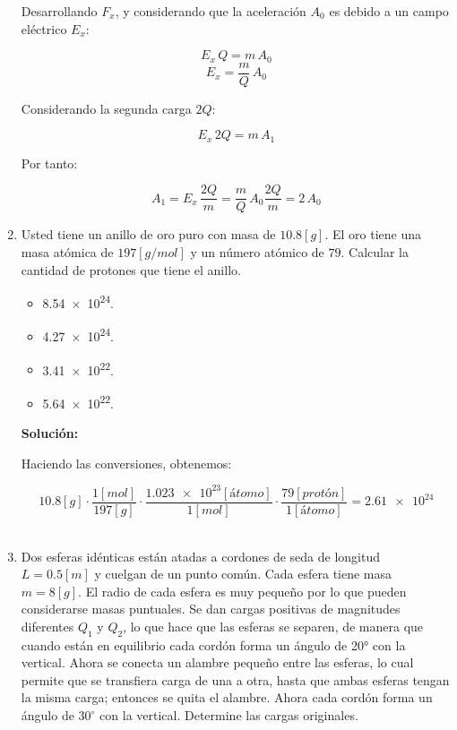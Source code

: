 \documentclass[letter,11pt]{article}
\begin{document}
\begin{enumerate}
Desarrollando $F_x$, y considerando que la aceleración $A_0$ es debido a un
campo eléctrico $E_x$:

\begin{equation*}
    E_x\,Q = m\,A_0
\end{equation*}
\begin{equation*}
    E_x = \frac{m}{Q}\,A_0
\end{equation*}

Considerando la segunda carga $2Q$:

\begin{equation*}
    E_x\,2Q = m\,A_1
\end{equation*}

Por tanto:

\begin{equation*}
    A_1 = E_x\,\frac{2Q}{m} = \frac{m}{Q}\,A_0 \frac{2Q}{m} = 2\,A_0
\end{equation*}

\item Usted tiene un anillo de oro puro con masa de $10.8 [g]$. El oro tiene una
masa atómica de $197 [g/mol]$ y un número atómico de $79$. Calcular la cantidad
de protones que tiene el anillo.

\begin{itemize}
    \item \num{8.54e24}.
    \item \num{4.27e24}.
    \item \num{3.41e22}.
    \item \num{5.64e22}.
\end{itemize}

\textbf{Solución:}

Haciendo las conversiones, obtenemos:

\begin{equation*}
    10.8 [g] \cdot \frac{1 [mol]}{197 [g]} \cdot \frac{\num{1.023e23}[átomo]}{1 [mol]} \cdot \frac{79 [protón]}{1 [átomo]} = \num{2.61e24}
\end{equation*}
\\

\item Dos esferas idénticas están atadas a cordones de seda de longitud
$L = 0.5 [m]$ y cuelgan de un punto común. Cada esfera tiene masa $m =8 [g]$. El
radio de cada esfera es muy pequeño por lo que pueden considerarse masas
puntuales. Se dan cargas positivas de magnitudes diferentes $Q_1$ y $Q_2$, lo
que hace que las esferas se separen, de manera que cuando están en equilibrio
cada cordón forma un ángulo de 20° con la vertical. Ahora se conecta un alambre
pequeño entre las esferas, lo cual permite que se transfiera carga de una a
otra, hasta que ambas esferas tengan la misma carga; entonces se quita el
alambre. Ahora cada cordón forma un ángulo de $30^\circ$ con la vertical.
Determine las cargas originales.


\end{enumerate}
\end{document}

